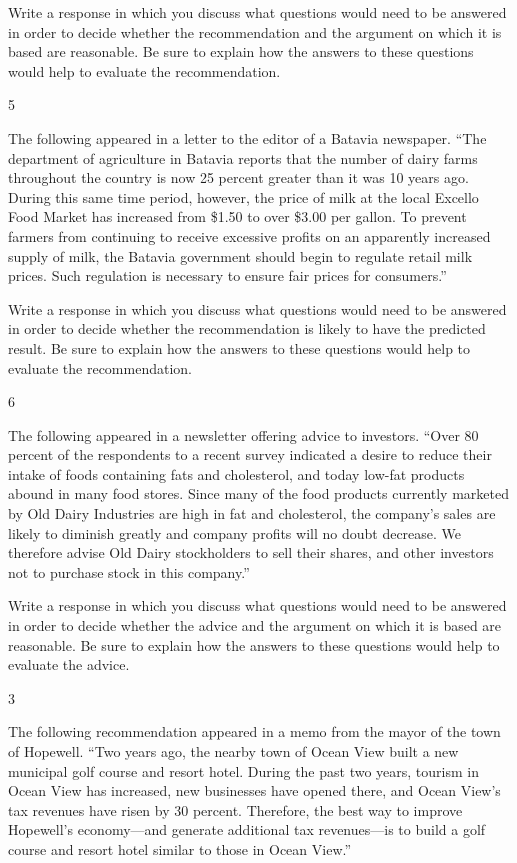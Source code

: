 \documentclass[]{article}
\begin{document}
Write a response in which you discuss what questions would need to be
answered in order to decide whether the recommendation and the argument
on which it is based are reasonable. Be sure to explain how the answers
to these questions would help to evaluate the recommendation.

5

The following appeared in a letter to the editor of a Batavia newspaper.
``The department of agriculture in Batavia reports that the number of
dairy farms throughout the country is now 25 percent greater than it was
10 years ago. During this same time period, however, the price of milk
at the local Excello Food Market has increased from \$1.50 to over
\$3.00 per gallon. To prevent farmers from continuing to receive
excessive profits on an apparently increased supply of milk, the Batavia
government should begin to regulate retail milk prices. Such regulation
is necessary to ensure fair prices for consumers.''

Write a response in which you discuss what questions would need to be
answered in order to decide whether the recommendation is likely to have
the predicted result. Be sure to explain how the answers to these
questions would help to evaluate the recommendation.

6

The following appeared in a newsletter offering advice to investors.
``Over 80 percent of the respondents to a recent survey indicated a
desire to reduce their intake of foods containing fats and cholesterol,
and today low-fat products abound in many food stores. Since many of the
food products currently marketed by Old Dairy Industries are high in fat
and cholesterol, the company's sales are likely to diminish greatly and
company profits will no doubt decrease. We therefore advise Old Dairy
stockholders to sell their shares, and other investors not to purchase
stock in this company.''

Write a response in which you discuss what questions would need to be
answered in order to decide whether the advice and the argument on which
it is based are reasonable. Be sure to explain how the answers to these
questions would help to evaluate the advice.

3

The following recommendation appeared in a memo from the mayor of the
town of Hopewell. ``Two years ago, the nearby town of Ocean View built a
new municipal golf course and resort hotel. During the past two years,
tourism in Ocean View has increased, new businesses have opened there,
and Ocean View's tax revenues have risen by 30 percent. Therefore, the
best way to improve Hopewell's economy---and generate additional tax
revenues---is to build a golf course and resort hotel similar to those
in Ocean View.''
\end{document}
